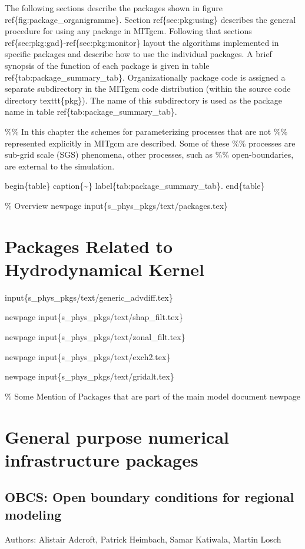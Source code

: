 \documentclass[letterpaper,10pt,english]{sphinxmanual}
\begin{document}
The following sections describe the packages shown in
figure ref\{fig:package\_organigramme\}. Section ref\{sec:pkg:using\}
describes the general procedure for using any package in MITgcm.
Following that sections ref\{sec:pkg:gad\}-ref\{sec:pkg:monitor\}
layout the algorithms implemented in specific packages
and describe how to use the individual packages. A brief synopsis of the
function of each package is given in table ref\{tab:package\_summary\_tab\}.
Organizationally package code is assigned a
separate subdirectory in the MITgcm code distribution
(within the source code directory texttt\{pkg\}).
The name of this subdirectory is used as the package name in
table ref\{tab:package\_summary\_tab\}.

\%\% In this chapter the schemes for parameterizing processes that are not
\%\% represented explicitly in MITgcm are described.  Some of these
\%\% processes are sub-grid scale (SGS) phenomena, other processes, such as
\%\% open-boundaries, are external to the simulation.

begin\{table\}
caption\{\textasciitilde{}\}
label\{tab:package\_summary\_tab\}.
end\{table\}

\% Overview
newpage
input\{s\_phys\_pkgs/text/packages.tex\}


\section{Packages Related to Hydrodynamical Kernel}
\label{\detokenize{phys_pkgs/phys_pkgs:packages-related-to-hydrodynamical-kernel}}
input\{s\_phys\_pkgs/text/generic\_advdiff.tex\}

newpage
input\{s\_phys\_pkgs/text/shap\_filt.tex\}

newpage
input\{s\_phys\_pkgs/text/zonal\_filt.tex\}

newpage
input\{s\_phys\_pkgs/text/exch2.tex\}

newpage
input\{s\_phys\_pkgs/text/gridalt.tex\}

\% Some Mention of Packages that are part of the main model document
newpage


\section{General purpose numerical infrastructure packages}
\label{\detokenize{phys_pkgs/phys_pkgs:general-purpose-numerical-infrastructure-packages}}

\subsection{OBCS: Open boundary conditions for regional modeling}
\label{\detokenize{phys_pkgs/phys_pkgs:pkg-obcs}}\label{\detokenize{phys_pkgs/phys_pkgs:obcs-open-boundary-conditions-for-regional-modeling}}
Authors:
Alistair Adcroft, Patrick Heimbach, Samar Katiwala, Martin Losch
\end{document}
